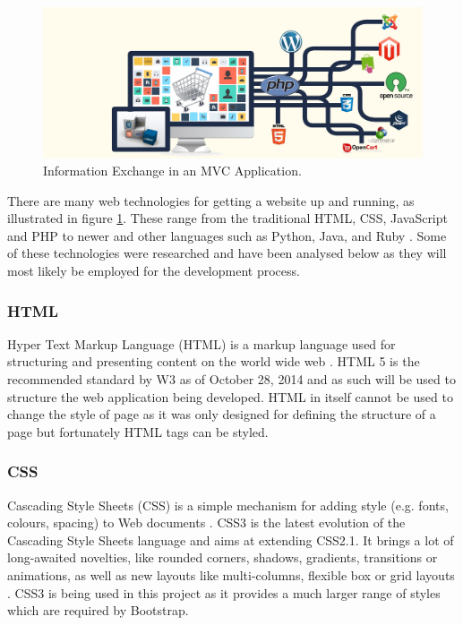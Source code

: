 \begin{figure}[H]
  \centering
  \includegraphics[width=1.0\textwidth]{Images/Research/Technologies/WebTechnologies}
  \caption{Information Exchange in an MVC Application.} \label{fig:WebTechnologies} 
\end{figure}

There are many web technologies for getting a website up and running, as illustrated in figure \ref{fig:WebTechnologies}. These range from the traditional HTML, CSS, JavaScript and PHP to newer and other languages such as Python, Java, and Ruby \cite{Differential:WebTechnologies}. Some of these technologies were researched and have been analysed below as they will most likely be employed for the development process.

\subsubsection{HTML} 
Hyper Text Markup Language (HTML) is a markup language used for structuring and presenting content on the world wide web \cite{W3:HTML5}. HTML 5 is the recommended standard by W3 as of October 28, 2014 and as such will be used to structure the web application being developed. HTML in itself cannot be used to change the style of page as it was only designed for defining the structure of a page but fortunately HTML tags can be styled. 

\subsubsection{CSS} 
Cascading Style Sheets (CSS) is a simple mechanism for adding style (e.g. fonts, colours, spacing) to Web documents \cite{W3:CSS}. CSS3 is the latest evolution of the Cascading Style Sheets language and aims at extending CSS2.1. It brings a lot of long-awaited novelties, like rounded corners, shadows, gradients, transitions or animations, as well as new layouts like multi-columns, flexible box or grid layouts \cite{Mozilla:CSS3}. CSS3 is being used in this project as it provides a much larger range of styles which are required by Bootstrap.

